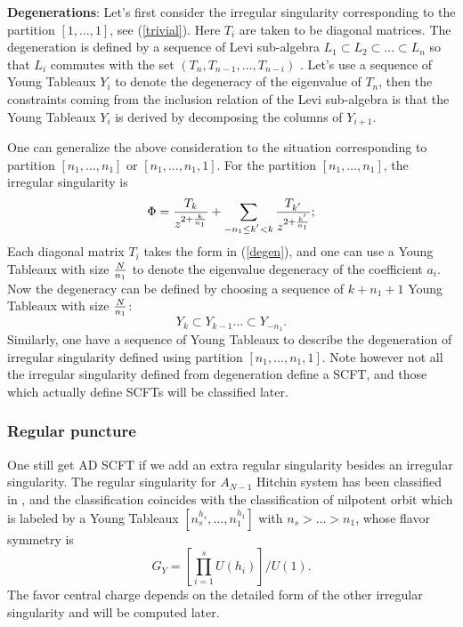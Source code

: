 \documentclass[a4paper,11pt]{article}
\begin{document}
\textbf{Degenerations}: 
Let's first consider the irregular singularity corresponding to the partition $[1,\ldots, 1]$, see (\ref{trivial}).
Here $T_i$ are taken to be diagonal matrices. The degeneration is defined by a sequence of Levi sub-algebra $L_1\subset L_2 \subset \ldots \subset L_n$ so that $L_i$ commutes 
with the set $(T_n,T_{n-1},\ldots, T_{n-i})$ \cite{Witten:2007td}.  Let's use a sequence of Young Tableaux $Y_i$ to denote the degeneracy of 
the eigenvalue of $T_n$, then the constraints coming from the inclusion relation of the Levi sub-algebra is that the Young Tableaux $Y_i$ is 
derived by decomposing the columns of $Y_{i+1}$. 

One can generalize the above consideration to the situation corresponding to  partition $[n_1,\ldots, n_1]$ or $[n_1, \ldots, n_1, 1]$. For the partition $[n_1,\ldots, n_1]$, the irregular singularity is 
\begin{equation}
\Phi={T_k\over z^{2+{k\over n_1}}}+\sum_{-{n_1}\leq k^{'}<k} {T_{k^{'}}\over z^{2+{k^{'}\over n_1}}};
\end{equation}
Each diagonal matrix $T_i$ takes the form in (\ref{degen}), and one can use a Young Tableaux with size ${N\over n_1}$ to denote the eigenvalue degeneracy of the coefficient $a_i$. Now 
the degeneracy can be defined by choosing a sequence of  $k+n_1+1$ Young Tableaux with size ${N\over n_1}$:
\begin{equation}
Y_{k}\subset Y_{k-1} \ldots \subset Y_{-n_{1}}.
\end{equation} 
Similarly, one have a sequence of Young Tableaux to describe the degeneration of irregular singularity defined using partition $[n_1,\ldots, n_1, 1]$. 
Note however not all the irregular singularity defined from degeneration define a SCFT, and those which actually define SCFTs will 
be classified later. 



\subsubsection{Regular puncture}
One still get AD SCFT if we add an extra regular singularity besides an irregular singularity. 
The regular singularity for $A_{N-1}$ Hitchin system has been classified in \cite{Gaiotto:2009we}, and the classification coincides with 
the classification of nilpotent orbit which  is labeled by a Young Tableaux  $[n_s^{h_s},\ldots, n_1^{h_1} ]$ with $n_s>\ldots>n_1$, whose
 flavor symmetry is 
\begin{equation}
G_{Y}=[\prod_{i=1}^s U(h_i)]/U(1).
\end{equation}
The favor central charge depends on the detailed form of the other irregular singularity and will be computed later. 
\end{document}
